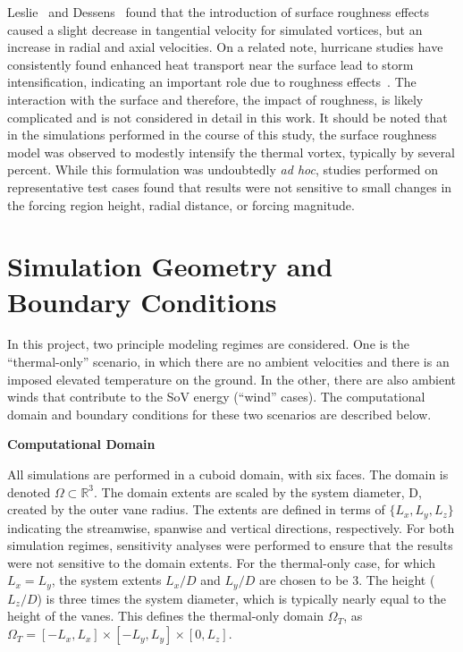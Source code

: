 Leslie~\cite{leslie1977surface} and Dessens~\cite{dessens1972influence}
found that the introduction of surface roughness effects caused a slight
decrease in tangential velocity for simulated vortices, but an increase
in radial and axial velocities. 
On a related note, hurricane studies have
consistently found enhanced heat transport near the surface lead
to storm intensification, indicating an important role due to roughness
effects~\cite{Zeng2010,GRL:GRL50047,hurricane_drag}. The interaction
with the surface and therefore, the impact of roughness, is likely
complicated and is not considered in detail in this work. It should be 
noted that in the simulations performed in the course of this study, the
surface roughness model was observed to modestly intensify the thermal
vortex, typically by several percent. While this formulation was
undoubtedly {\it ad hoc}, studies performed on representative test 
cases found that results were not sensitive to small
changes in the forcing region height, radial distance, or
forcing magnitude. 


\section{Simulation Geometry and Boundary Conditions}
\label{sec:bc}

In this project, two principle modeling regimes are considered.  
One is the ``thermal-only'' scenario, in which there are no ambient
velocities and there is an imposed elevated temperature on the ground.  
In the other, there are also ambient winds that contribute to the SoV energy
(``wind'' cases). 
The computational domain and boundary conditions for these 
two scenarios are described below.

\textbf{Computational Domain} 

All simulations are performed in a cuboid domain, with six
faces.  The domain is denoted $\Omega \subset \mathbb{R}^3$. 
The domain extents are scaled by the system diameter, D, created by the
outer vane radius. The extents are defined in terms of $\{L_x,L_y,L_z\}$ indicating the 
streamwise, spanwise and vertical directions, respectively. 
For both simulation regimes, sensitivity analyses 
were performed to ensure that the results were not sensitive 
to the domain extents. For the thermal-only case, for which $L_x = L_y$,
the system 
extents $L_x/D$ and $L_y/D$ are chosen to be 3. The height ($L_z/D$) is
three times the system diameter, which is typically nearly equal to the
height of the vanes. This defines the thermal-only domain $\Omega_T$, 
as $\Omega_T = \left[-L_x,L_x \right] \times \left[-L_y,L_y \right]
\times \left[0,L_z \right]$.   

